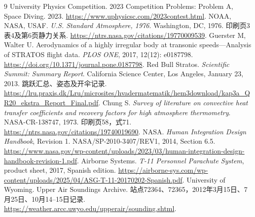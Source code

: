 \documentclass[11pt,a4paper]{article}
\begin{document}
\begin{thebibliography}{9}
 University Physics Competition. 2023 Competition Problems: Problem A, Space Diving. 2023. \url{https://www.uphysicsc.com/2023contest.html}.
 NOAA, NASA, USAF. \emph{U.S. Standard Atmosphere, 1976}. Washington, DC, 1976. 印刷页3表4及第6页静力关系. \url{https://ntrs.nasa.gov/citations/19770009539}.
 Guerster M, Walter U. Aerodynamics of a highly irregular body at transonic speeds---Analysis of STRATOS flight data. \emph{PLOS ONE}, 2017, 12(12): e0187798. \url{https://doi.org/10.1371/journal.pone.0187798}.
 Red Bull Stratos. \emph{Scientific Summit: Summary Report}. California Science Center, Los Angeles, January 23, 2013. 跳跃汇总、姿态及开伞记录. \url{https://lru.praxis.dk/Lru/microsites/hvadermatematik/hem3download/kap3a_QR20_ekstra_Report_Final.pdf}.
 Chung S. \emph{Survey of literature on convective heat transfer coefficients and recovery factors for high atmosphere thermometry}. NASA-CR-138747, 1973. 印刷页58，式71. \url{https://ntrs.nasa.gov/citations/19740019690}.
 NASA. \emph{Human Integration Design Handbook}, Revision 1. NASA/SP-2010-3407/REV1, 2014, Section 6.5. \url{https://www.nasa.gov/wp-content/uploads/2023/03/human-integration-design-handbook-revision-1.pdf}.
 Airborne Systems. \emph{T-11 Personnel Parachute System}, product sheet, 2017, Spanish edition. \url{https://airborne-sys.com/wp-content/uploads/2025/04/ASG-T-11-20170202-Spanish.pdf}.
 University of Wyoming. Upper Air Soundings Archive. 站点72364、72365，2012年3月15日、7月25日、10月14--15日记录. \url{https://weather.arcc.uwyo.edu/upperair/sounding.shtml}.
\end{thebibliography}
\end{document}
